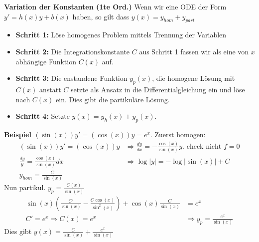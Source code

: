 \documentclass[25pt]{sciposter}
\newenvironment{method}[1]{\begin{mdframed}[backgroundcolor=blue!10,innertopmargin=15pt, innerbottommargin=15pt, nobreak=true]
		\textbf{#1 }
	}
	{ 
	\end{mdframed}
}
\begin{document}
\begin{multicols}{3}
\begin{method}{Variation der Konstanten (1te Ord.)} Wenn wir eine ODE der Form $y' = h(x)y + b(x)$ haben, so gilt dass $y(x) = y_{hom} + y_{part}$
\begin{itemize}
	\item \textbf{Schritt 1: } Löse homogenes Problem mittels Trennung der Variablen
	\item \textbf{Schritt 2: } Die Integrationskonstante $C$ aus Schritt 1 fassen wir als eine von $x$ abhängige Funktion $C(x)$ auf.
	\item \textbf{Schritt 3: } Die enstandene Funktion $y_p(x)$, die homogene Lösung mit $C(x)$ anstatt $C$ setzte als Ansatz in die Differentialgleichung ein und löse nach $C(x)$ ein. Dies gibt die partikuläre Lösung.
	\item \textbf{Schritt 4: } Setzte $y(x) = y_h(x) + y_p(x)$.
\end{itemize}
	
\end{method}




\textbf{Beispiel $(\sin(x))y' = (\cos(x))y = e^x$}. Zuerst homogen:
\begin{align*}
(\sin(x))y' = (\cos(x))y &\Rightarrow \frac{dy}{dx} = - \frac{\cos(x)}{\sin(x)}y. \text{ check nicht } f=0\\	
\frac{dy}{y} = \frac{\cos(x)}{\sin(x)}dx &\Rightarrow \log|y| = -\log|\sin(x)| + C\\
y_{hom}= \frac{C}{\sin(x)}
\end{align*}
Nun partikul. $y_p = \frac{C(x)}{\sin(x)}$
\begin{align*}
\sin(x) \left(\frac{C'}{\sin(x)} - \frac{C\cos(x)}{\sin^2(x)}\right) + \cos(x)\frac{C}{\sin(x)} &= e^x\\
C' = e^x \Rightarrow C(x) = e^x &\Rightarrow y_p = \frac{e^x}{\sin(x)}
\end{align*}
Dies gibt $y(x) = \frac{C}{\sin(x)} + \frac{e^x}{\sin(x)}$




\end{multicols}
\end{document}

